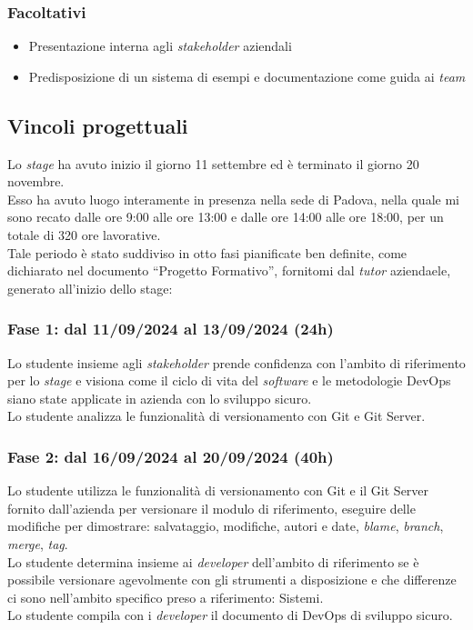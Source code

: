\subsubsection*{Facoltativi}
\begin{itemize}
    \item Presentazione interna agli \emph{stakeholder} aziendali
    \item Predisposizione di un sistema di esempi e documentazione come guida ai \emph{team}\\
\end{itemize}


\subsection{Vincoli progettuali}
Lo \emph{stage} ha avuto inizio il giorno 11 settembre ed è terminato il giorno 20 novembre.\\
Esso ha avuto luogo interamente in presenza nella sede di Padova, nella quale mi sono recato dalle ore 9:00 alle ore 13:00 e dalle ore 14:00 alle ore 18:00, per un totale di 320 ore lavorative.\\
Tale periodo è stato suddiviso in otto fasi pianificate ben definite, come dichiarato nel documento “Progetto Formativo”, fornitomi dal \emph{tutor} aziendaele, generato all'inizio dello stage:
\subsubsection*{Fase 1: dal 11/09/2024 al 13/09/2024 (24h)}
Lo studente insieme agli \emph{stakeholder} prende confidenza con l'ambito di riferimento per lo \emph{stage} e visiona come il ciclo di vita del \emph{software} e le metodologie \gls{DevOps} siano state applicate in azienda con lo sviluppo sicuro.\\
Lo studente analizza le funzionalità di versionamento con Git e Git Server.\\

\subsubsection*{Fase 2: dal 16/09/2024 al 20/09/2024 (40h) }
Lo studente utilizza le funzionalità di versionamento con Git e il Git Server fornito dall'azienda per versionare il modulo di riferimento, eseguire delle modifiche per dimostrare: salvataggio, modifiche, autori e date, \emph{blame}, \emph{branch}, \emph{merge}, \emph{tag}.\\
Lo studente determina insieme ai \emph{developer} dell'ambito di riferimento se è possibile versionare agevolmente con gli strumenti a disposizione e che differenze ci sono nell'ambito specifico preso a riferimento: \gls{Sistemi}.\\
Lo studente compila con i \emph{developer} il documento di \gls{DevOps} di sviluppo sicuro.\\

